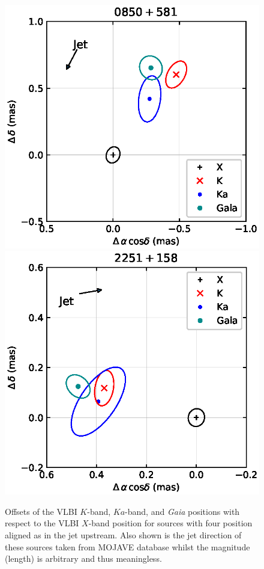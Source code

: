 \documentclass[referee]{aa}        %
\begin{document}
\begin{appendix}
\begin{figure}[hbtp]
        \includegraphics[width=0.45\columnwidth]{figs/0850+581}
        \includegraphics[width=0.45\columnwidth]{figs/2251+158}
        \caption[]{\label{fig:jet-up}
            Offsets of the VLBI $K$-band, $Ka$-band, and {\it Gaia} positions with respect to the VLBI $X$-band position for sources with four position aligned as in the jet upstream.
            Also shown is the jet direction of these sources taken from MOJAVE database whilst the magnitude (length) is arbitrary and thus meaningless.
        }
    \end{figure}



\end{appendix}
\end{document}
